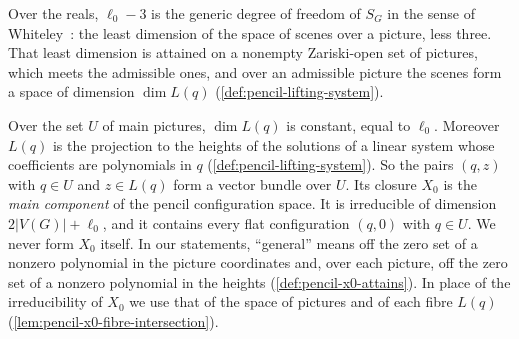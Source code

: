 Over the reals, $\ell_0 - 3$ is the generic degree of freedom of $S_G$
in the sense of Whiteley~\cite[Definition~2.4]{whiteley1984}: the least
dimension of the space of scenes over a picture, less three. That least
dimension is attained on a nonempty Zariski-open set of pictures, which
meets the admissible ones, and over an admissible picture the scenes
form a space of dimension $\dim L(q)$
(\cref{def:pencil-lifting-system}).

\begin{remark}
  \label{rem:pencil-x0-main-component}
  Over the set $U$ of main pictures, $\dim L(q)$ is constant, equal to
  $\ell_0$. Moreover $L(q)$ is the projection to the heights of the
  solutions of a linear system whose coefficients are polynomials in $q$
  (\cref{def:pencil-lifting-system}). So the pairs $(q, z)$
  with $q \in U$ and $z \in L(q)$ form a vector bundle over $U$. Its
  closure $X_0$ is the \emph{main component} of the pencil configuration
  space. It is irreducible of dimension $2|V(G)| + \ell_0$, and it
  contains every flat configuration $(q, 0)$ with $q \in U$. We never
  form $X_0$ itself. In our statements, ``general'' means off the zero
  set of a nonzero polynomial in the picture coordinates and, over each
  picture, off the zero set of a nonzero polynomial in the heights
  (\cref{def:pencil-x0-attains}). In place of the irreducibility of
  $X_0$ we use that of the space of pictures and of each fibre $L(q)$
  (\cref{lem:pencil-x0-fibre-intersection}).
\end{remark}


